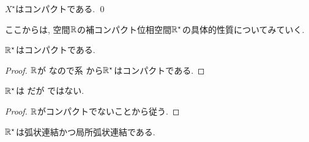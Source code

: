 \documentclass[uplatex, dvipdfmx, a4paper, 12pt, class=jsbook, crop=false]{standalone}
\begin{document}
\begin{corollary}
    $ X^\star $はコンパクトである. \qed
\end{corollary}




ここからは, \Euclid 空間$ \mathbb{R} $の補コンパクト位相空間$ \mathbb{R}^\star $の具体的性質についてみていく.

\begin{property}
	$ \mathbb{R}^\star $はコンパクトである.
\end{property}

\begin{proof}
	$ \mathbb{R} $が \Hausdorff なので系  から$ \mathbb{R}^\star $はコンパクトである.
\end{proof}

\begin{property}
	$ \mathbb{R}^\star $は  だが  ではない.
\end{property}

\begin{proof}
	$ \mathbb{R} $がコンパクトでないことから従う.
\end{proof}

\begin{property}
	$ \mathbb{R}^\star $は弧状連結かつ局所弧状連結である.
\end{property}
\end{document}
